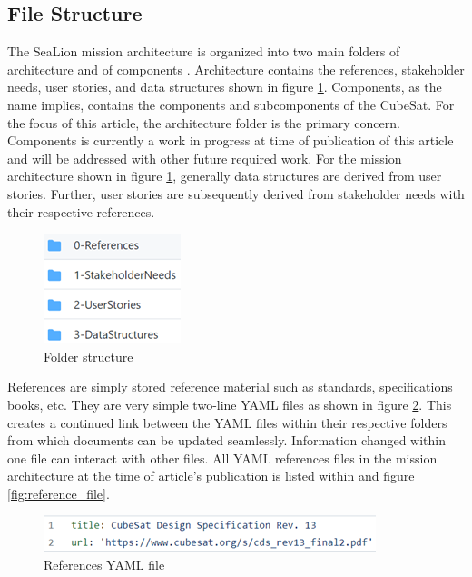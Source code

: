 \documentclass[journal,article,submit,pdftex,moreauthors]{Definitions/mdpi}
\begin{document}
\subsection{File Structure}
The SeaLion mission architecture is organized into two main folders of architecture and of components \cite{sealion_mission_architecture}.  Architecture contains the references, stakeholder needs, user stories, and data structures shown in figure \ref{fig:folders}.  Components, as the name implies, contains the components and subcomponents of the CubeSat.  For the focus of this article, the architecture folder is the primary concern.  Components is currently a work in progress at time of publication of this article and will be addressed with other future required work.  For the mission architecture shown in figure \ref{fig:folders}, generally data structures are derived from user stories.  Further, user stories are subsequently derived from stakeholder needs with their respective references.

\begin{figure}[H]
    \includegraphics{assets/folders.png}
    \caption{Folder structure}
	\label{fig:folders}
    \end{figure}
	\noindent   
\unskip

References are simply stored reference material such as standards, specifications books, etc.  They are very simple two-line YAML files as shown in figure \ref{fig:reference_yaml}.  This creates a continued link between the YAML files within their respective folders from which documents can be updated seamlessly.  Information changed within one file can interact with other files.  All YAML references files in the mission architecture at the time of article's publication is listed within and figure \ref{fig:reference_file}. 

\begin{figure}[H]
    \includegraphics[width=10.5 cm]{assets/reference.png}
    \caption{References YAML file}
	\label{fig:reference_yaml}
    \end{figure}   
\unskip
\end{document}
